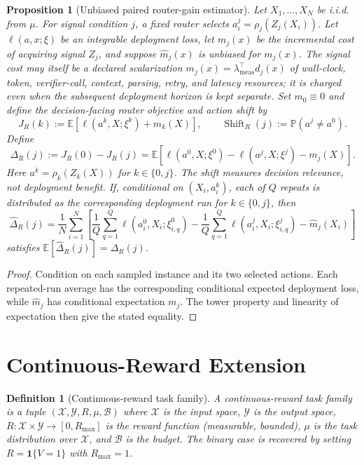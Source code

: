 \documentclass[10pt]{article}
\theoremstyle{paperplain}
\newtheorem{proposition}[theorem]{Proposition}
\theoremstyle{paperdefinition}
\newtheorem{definition}[theorem]{Definition}
\theoremstyle{paperremark}
\newcommand{\E}{\mathbb{E}}
\newcommand{\Prb}{\mathbb{P}}
\newcommand{\cX}{\mathcal{X}}
\newcommand{\cY}{\mathcal{Y}}
\newcommand{\cB}{\mathcal{B}}
\begin{document}
\begin{proposition}[Unbiased paired router-gain estimator]
\label{prop:paired-unbiased}
Let $X_1,\ldots,X_N$ be i.i.d. from $\mu$.
For signal condition $j$, a fixed router selects
$a_i^j=\rho_j(Z_j(X_i))$.
Let $\ell(a,x;\xi)$ be an integrable deployment loss, let $m_j(x)$ be the incremental cost of acquiring signal $Z_j$, and suppose $\widehat m_j(x)$ is unbiased for $m_j(x)$.
The signal cost may itself be a declared scalarization
\(m_j(x)=\lambda_{\mathrm{meas}}^\top d_j(x)\) of wall-clock, token,
verifier-call, context, parsing, retry, and latency resources; it is charged even
when the subsequent deployment horizon is kept separate.
Set \(m_0\equiv0\) and define the decision-facing router objective and action
shift by
\[
J_R(k):=\E[\ell(a^k,X;\xi^k)+m_k(X)],
\qquad
\operatorname{Shift}_R(j):=\Prb(a^j\ne a^0).
\]
Define
\[
\Delta_R(j)
:=J_R(0)-J_R(j)
=
\E\!\left[
\ell(a^0,X;\xi^0)-\ell(a^j,X;\xi^j)-m_j(X)
\right].
\]
Here $a^k=\rho_k(Z_k(X))$ for $k\in\{0,j\}$.
The shift measures decision relevance, not deployment benefit.
If, conditional on $(X_i,a_i^k)$, each of $Q$ repeats is distributed as the corresponding deployment run for $k\in\{0,j\}$, then
\[
\widehat\Delta_R(j)
=
\frac1N\sum_{i=1}^N
\left[
\frac1Q\sum_{q=1}^Q\ell(a_i^0,X_i;\xi_{i,q}^0)
-\frac1Q\sum_{q=1}^Q\ell(a_i^j,X_i;\xi_{i,q}^j)
-\widehat m_j(X_i)
\right]
\]
satisfies $\E[\widehat\Delta_R(j)]=\Delta_R(j)$.
\end{proposition}

\begin{proof}
Condition on each sampled instance and its two selected actions.
Each repeated-run average has the corresponding conditional expected deployment loss, while $\widehat m_j$ has conditional expectation $m_j$.
The tower property and linearity of expectation then give the stated equality.
\end{proof}


\section{Continuous-Reward Extension}
\label{app:continuous-reward}

\begin{definition}[Continuous-reward task family]
\label{def:continuous-reward-task}
A \emph{continuous-reward task family} is a tuple $(\cX, \cY, R, \mu, \cB)$ where
$\cX$ is the input space, $\cY$ is the output space,
$R : \cX \times \cY \to [0, R_{\max}]$ is the reward function (measurable, bounded),
$\mu$ is the task distribution over $\cX$, and $\cB$ is the budget.
The binary case is recovered by setting $R = \mathbf{1}\{V = 1\}$ with $R_{\max} = 1$.
\end{definition}
\end{document}
